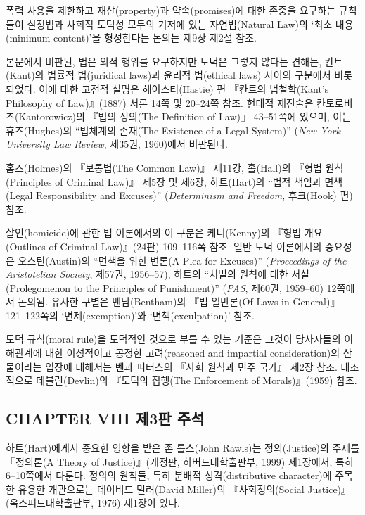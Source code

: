 { 폭력 사용을 제한하고
재산(property)과 약속(promises)에 대한 존중을 요구하는 규칙들이 실정법과
사회적 도덕성 모두의 기저에 있는 자연법(Natural Law)의 `최소
내용(minimum content)'을 형성한다는 논의는 제9장 제2절 참조.

 본문에서 비판된, 법은 외적 행위를
요구하지만 도덕은 그렇지 않다는 견해는, 칸트(Kant)의 법률적 법(juridical
laws)과 윤리적 법(ethical laws) 사이의 구분에서 비롯되었다. 이에 대한
고전적 설명은 헤이스티(Hastie) 편 『칸트의 법철학(Kant's Philosophy of
Law)』(1887) 서론 14쪽 및 20--24쪽 참조. 현대적 재진술은
칸토로비츠(Kantorowicz)의 『법의 정의(The Definition of Law)』
43--51쪽에 있으며, 이는 휴즈(Hughes)의 ``법체계의 존재(The Existence of
a Legal System)'' (\emph{New York University Law Review}, 제35권,
1960)에서 비판된다.

 홈즈(Holmes)의 『보통법(The
Common Law)』 제11강, 홀(Hall)의 『형법 원칙(Principles of Criminal
Law)』 제5장 및 제6장, 하트(Hart)의 ``법적 책임과 면책(Legal
Responsibility and Excuses)'' (\emph{Determinism and Freedom},
후크(Hook) 편) 참조.

 살인(homicide)에
관한 법 이론에서의 이 구분은 케니(Kenny)의 『형법 개요(Outlines of
Criminal Law)』(24판) 109--116쪽 참조. 일반 도덕 이론에서의 중요성은
오스틴(Austin)의 ``면책을 위한 변론(A Plea for Excuses)''
(\emph{Proceedings of the Aristotelian Society}, 제57권, 1956--57),
하트의 ``처벌의 원칙에 대한 서설(Prolegomenon to the Principles of
Punishment)'' (\emph{PAS}, 제60권, 1959--60) 12쪽에서 논의됨. 유사한
구별은 벤담(Bentham)의 『법 일반론(Of Laws in General)』 121--122쪽의
`면제(exemption)'와 `면책(exculpation)' 참조.

 도덕 규칙(moral rule)을
도덕적인 것으로 부를 수 있는 기준은 그것이 당사자들의 이해관계에 대한
이성적이고 공정한 고려(reasoned and impartial consideration)의
산물이라는 입장에 대해서는 벤과 피터스의 『사회 원칙과 민주 국가』 제2장
참조. 대조적으로 데블린(Devlin)의 『도덕의 집행(The Enforcement of
Morals)』(1959) 참조.

\subsection{CHAPTER VIII 제3판
주석}\label{chapter-viii-uxc81c3uxd310-uxc8fcuxc11d}

하트(Hart)에게서 중요한 영향을 받은 존 롤스(John Rawls)는
정의(Justice)의 주제를 『정의론(A Theory of Justice)』(개정판,
하버드대학출판부, 1999) 제1장에서, 특히 6--10쪽에서 다룬다. 정의의
원칙들, 특히 분배적 성격(distributive character)에 주목한 유용한
개관으로는 데이비드 밀러(David Miller)의 『사회정의(Social
Justice)』(옥스퍼드대학출판부, 1976) 제1장이 있다.

}
